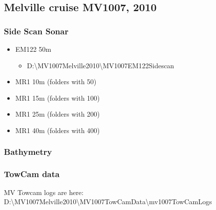 \documentclass[letterpaper,10pt,english]{sphinxmanual}
\begin{document}
\subsection{Melville cruise MV1007, 2010}
\label{\detokenize{02_folder_hierarchy:melville-cruise-mv1007-2010}}

\subsubsection{Side Scan Sonar}
\label{\detokenize{02_folder_hierarchy:side-scan-sonar}}\begin{itemize}
\item {} 
\sphinxAtStartPar
EM122 \sphinxhyphen{} 50m
\begin{itemize}
\item {} 
\sphinxAtStartPar
D:\textbackslash{}MV1007\sphinxhyphen{}Melville\sphinxhyphen{}2010\textbackslash{}MV1007\sphinxhyphen{}EM122\sphinxhyphen{}Sidescan

\end{itemize}

\item {} 
\sphinxAtStartPar
MR1 \sphinxhyphen{} 10m (folders with 50)

\item {} 
\sphinxAtStartPar
MR1 \sphinxhyphen{} 15m (folders with 100)

\item {} 
\sphinxAtStartPar
MR1 \sphinxhyphen{} 25m (folders with 200)

\item {} 
\sphinxAtStartPar
MR1 \sphinxhyphen{} 40m (folders with 400)

\end{itemize}


\subsubsection{Bathymetry}
\label{\detokenize{02_folder_hierarchy:bathymetry}}
\sphinxAtStartPar
{}


\subsubsection{TowCam data}
\label{\detokenize{02_folder_hierarchy:towcam-data}}
\sphinxAtStartPar
MV Towcam logs are here: D:\textbackslash{}MV1007\sphinxhyphen{}Melville\sphinxhyphen{}2010\textbackslash{}MV1007\sphinxhyphen{}TowCam\sphinxhyphen{}Data\textbackslash{}mv1007\sphinxhyphen{}TowCam\sphinxhyphen{}Logs
\end{document}
